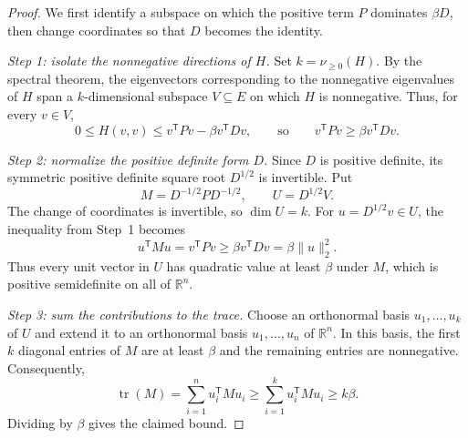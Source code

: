 \documentclass[10pt,a4paper]{amsart}
\begin{document}
\begin{proof}
We first identify a subspace on which the positive term $P$ dominates
$\beta D$, then change coordinates so that $D$ becomes the identity.

\smallskip
\noindent\emph{Step 1: isolate the nonnegative directions of $H$.}
Set $k=\nu_{\geq0}(H)$. By the spectral theorem, the eigenvectors
corresponding to the nonnegative eigenvalues of $H$ span a
$k$-dimensional subspace $V\subseteq E$ on which $H$ is nonnegative.
Thus, for every $v\in V$,
\[
 0\leq H(v,v)\leq v^{\mathsf T}Pv-\beta v^{\mathsf T}Dv,
 \qquad\text{so}\qquad
 v^{\mathsf T}Pv\geq\beta v^{\mathsf T}Dv.
\]

\smallskip
\noindent\emph{Step 2: normalize the positive definite form $D$.}
Since $D$ is positive definite, its symmetric positive definite
square root $D^{1/2}$ is invertible. Put
\[
 M=D^{-1/2}PD^{-1/2},\qquad U=D^{1/2}V.
\]
The change of coordinates is invertible, so $\dim U=k$.
For $u=D^{1/2}v\in U$, the inequality from Step~1 becomes
\[
 u^{\mathsf T}Mu
 =v^{\mathsf T}Pv
 \geq\beta v^{\mathsf T}Dv
 =\beta\|u\|_2^2.
\]
Thus every unit vector in $U$ has quadratic value at least $\beta$
under $M$, which is positive semidefinite on all of $\mathbb R^n$.

\smallskip
\noindent\emph{Step 3: sum the contributions to the trace.}
Choose an orthonormal basis $u_1,\ldots,u_k$ of $U$ and extend it
to an orthonormal basis $u_1,\ldots,u_n$ of $\mathbb R^n$.
In this basis, the first $k$ diagonal entries of $M$ are at least
$\beta$ and the remaining entries are nonnegative. Consequently,
\[
 \operatorname{tr}(M)
 =\sum_{i=1}^n u_i^{\mathsf T}Mu_i
 \geq\sum_{i=1}^k u_i^{\mathsf T}Mu_i
 \geq k\beta.
\]
Dividing by $\beta$ gives the claimed bound.
\end{proof}
\end{document}
